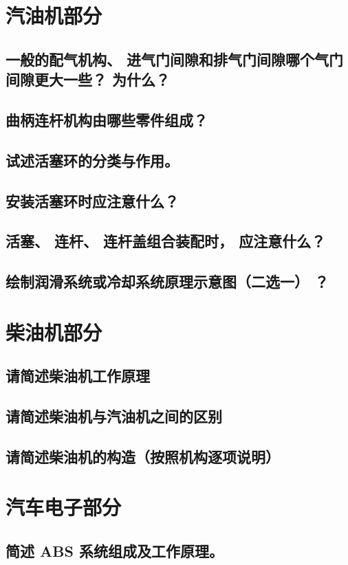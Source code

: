 \documentclass[UTF8]{ctexart}
\numberwithin{figure}{section}
\numberwithin{table}{section}
\begin{document}
\section{汽油机部分}
\subsection{一般的配气机构、 进气门间隙和排气门间隙哪个气门间隙更大一些？ 为什么？}
\subsection{曲柄连杆机构由哪些零件组成？}
\subsection{试述活塞环的分类与作用。}
\subsection{安装活塞环时应注意什么？}
\subsection{活塞、 连杆、 连杆盖组合装配时， 应注意什么？}
\subsection{绘制润滑系统或冷却系统原理示意图（二选一） ？}
\newpage

\section{柴油机部分}
\subsection{请简述柴油机工作原理}
\subsection{请简述柴油机与汽油机之间的区别}
\subsection{请简述柴油机的构造（按照机构逐项说明）}
\newpage

\section{汽车电子部分}
\subsection{简述 ABS 系统组成及工作原理。}
\end{document}
